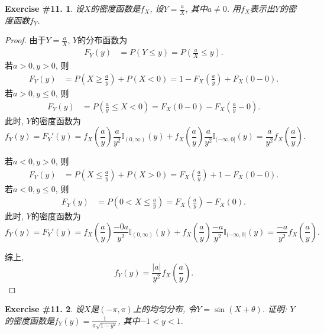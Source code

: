 \documentclass[UTF8, a4paper]{article}
\newtheorem{exercise}{Exercise \#11.}
\begin{document}
\begin{framed}
\begin{exercise}
设\(X\)的密度函数是\(f_X\), 设\(Y = \frac{a}{X}\), 其中\(a \neq 0\). 
用\(f_X\)表示出\(Y\)的密度函数\(f_Y\).
\end{exercise}
\end{framed}

\begin{proof}
由于\(Y = \frac{a}{X}\), \(Y\)的分布函数为 
$$
\begin{aligned}
F_Y(y) &= P(Y \leq y) = P\left(\frac{a}{X} \leq y\right).
\end{aligned}
$$
若\(a>0, y>0\), 则
$$
\begin{aligned}
F_Y(y) &= P\left(X \geq \frac{a}{y}\right) + P(X < 0) = 1 - F_X\left(\frac{a}{y}\right) + F_X(0-0).
\end{aligned}
$$
若\(a>0, y\leq 0\), 则
$$
\begin{aligned}
F_Y(y) &= P\left(\frac{a}{y} \leq X < 0\right) = F_X(0-0) - F_X\left(\frac{a}{y} - 0\right).
\end{aligned}
$$
此时, \(Y\)的密度函数为
$$
f_Y(y) = F_Y'(y) = f_X\left(\frac{a}{y}\right) \frac{a}{y^2} \mathbb{I}_{(0, \infty)}(y) + f_X\left(\frac{a}{y}\right) \frac{a}{y^2} \mathbb{I}_{(-\infty, 0]}(y) = \frac{a}{y^2} f_X\left(\frac{a}{y}\right).
$$

若\(a < 0, y > 0\), 则
$$
\begin{aligned}
F_Y(y) &= P\left(X \leq \frac{a}{y}\right) + P(X > 0) = F_X\left(\frac{a}{y}\right) + 1 - F_X(0-0).
\end{aligned}
$$
若\(a < 0, y \leq 0\), 则
$$
\begin{aligned}
F_Y(y) &= P\left(0 < X \leq \frac{a}{y}\right) = F_X\left(\frac{a}{y}\right) - F_X(0).
\end{aligned}
$$
此时, \(Y\)的密度函数为
$$
f_Y(y) = F_Y'(y) = f_X\left(\frac{a}{y}\right) \frac{-0a}{y^2} \mathbb{I}_{(0, \infty)}(y) + f_X\left(\frac{a}{y}\right) \frac{-a}{y^2} \mathbb{I}_{(-\infty, 0]}(y) = \frac{-a}{y^2} f_X\left(\frac{a}{y}\right).
$$

综上, 
$$
f_Y(y) = \frac{|a|}{y^2} f_X\left(\frac{a}{y}\right).
$$
\end{proof}


\begin{framed}
\begin{exercise}
设\(X\)是\((-\pi, \pi)\)上的均匀分布, 令\(Y = \sin(X+ \theta)\). 
证明: \(Y\)的密度函数是\(f_Y(y) = \frac{1}{\pi\sqrt{1-y^2}}\), 其中\(-1 < y < 1\).
\end{exercise}
\end{framed}
\end{document}
